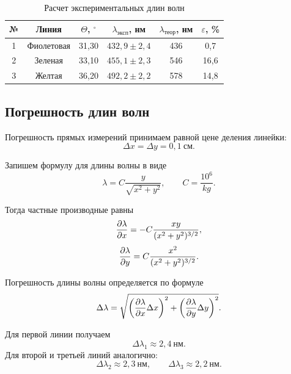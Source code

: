 \documentclass[a4paper,12pt]{article}
\begin{document}
\begin{table}[H]
\centering
\caption{Расчет экспериментальных длин волн}
\label{tab:grating_results}
\begin{tabular}{|c|c|c|c|c|c|}
\hline
№ & Линия & $\Theta$, $^\circ$ & $\lambda_{\text{эксп}}$, нм & $\lambda_{\text{теор}}$, нм & $\varepsilon$, \% \\
\hline
1 & Фиолетовая & 31{,}30 & $432{,}9\pm2{,}4$ & 436 & 0{,}7 \\
\hline
2 & Зеленая & 33{,}10 & $455{,}1\pm2{,}3$ & 546 & 16{,}6 \\
\hline
3 & Желтая & 36{,}20 & $492{,}2\pm2{,}2$ & 578 & 14{,}8 \\
\hline
\end{tabular}
\end{table}

\subsection{Погрешность длин волн}

Погрешность прямых измерений принимаем равной цене деления линейки:
\begin{equation}
    \Delta x=\Delta y=0{,}1~\text{см}.
\end{equation}

Запишем формулу для длины волны в виде
\begin{equation}
    \lambda = C\frac{y}{\sqrt{x^2+y^2}}, \qquad C=\frac{10^6}{kg}.
\end{equation}

Тогда частные производные равны
\begin{equation}
    \pdv{\lambda}{x}=-C\frac{xy}{(x^2+y^2)^{3/2}},
\end{equation}
\begin{equation}
    \pdv{\lambda}{y}=C\frac{x^2}{(x^2+y^2)^{3/2}}.
\end{equation}

Погрешность длины волны определяется по формуле
\begin{equation}
    \Delta\lambda=\sqrt{\left(\pdv{\lambda}{x}\Delta x\right)^2+\left(\pdv{\lambda}{y}\Delta y\right)^2}.
\end{equation}

Для первой линии получаем
\begin{equation}
    \Delta\lambda_1\approx2{,}4~\text{нм}.
\end{equation}
Для второй и третьей линий аналогично:
\begin{equation}
    \Delta\lambda_2\approx2{,}3~\text{нм}, \qquad
    \Delta\lambda_3\approx2{,}2~\text{нм}.
\end{equation}
\end{document}
